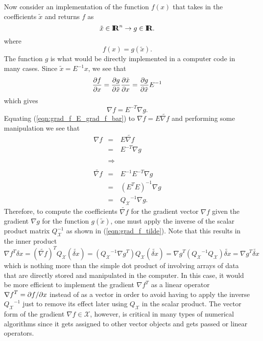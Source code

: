 Now consider an implementation of the function $f(x)$ that takes in the coefficients
$\tilde{x}$ and returns $f$ as
%
\[
\tilde{x}\in\mbox{\textbf{I}}\hspace{-0.6ex}\mbox{\textbf{R}}^n \rightarrow g\in\mbox{\textbf{I}}\hspace{-0.6ex}\mbox{\textbf{R}}.
\]
%
where
%
\[
f(x) = g(\tilde{x}).
\]
%
The function $g$ is what would be directly implemented in a computer code in
many cases.  Since $\tilde{x} = E^{-1} x$, we see that
%
\[
\displaystyle{\frac{\partial f}{\partial x}} = \displaystyle{\frac{\partial g}{\partial \tilde{x}}} \displaystyle{\frac{\partial \tilde{x}}{\partial x}}  = \displaystyle{\frac{\partial g}{\partial \tilde{x}}} E^{-1}
\]
%
which gives
%
\begin{equation}
\nabla f = E^{-T} \nabla g.
\label{eqn:grad_f_E_grad_f_bar}
\end{equation}
%
Equating (\ref{eqn:grad_f_E_grad_f_bar}) to $\nabla f = E {}\tilde{\nabla f}$
and performing some manipulation we see that
%
\begin{eqnarray}
\nabla f
& = & E \tilde{\nabla f} \nonumber \\
& = & E^{-T} \nabla g \nonumber \\
& & \nonumber \\
& \Rightarrow & \nonumber \\
& & \nonumber \\
\tilde{\nabla f}
& = & E^{-1} E^{-T} \nabla g \nonumber \\
& = & (E^T E)^{-1} \nabla g \nonumber \\
& = & {Q_{\mathcal{X}}}^{-1} \nabla g.
\label{eqn:grad_f_tilde}
\end{eqnarray}
%
Therefore, to compute the coefficients $\tilde{\nabla f}$ for the gradient
vector $\nabla f$ given the gradient $\nabla g$ for the function
$g(\tilde{x})$, one must apply the inverse of the scalar product matrix
$Q_{\mathcal{X}}^{-1}$ as shown in (\ref{eqn:grad_f_tilde}).  Note that this
results in the inner product
%
\[
{\nabla f}^T \delta x = (\tilde{\nabla f})^T Q_{\mathcal{X}} (\tilde{\delta x})
= ({Q_{\mathcal{X}}}^{-1} {\nabla g}^T) Q_{\mathcal{X}} (\tilde{\delta x})
= {\nabla g}^T ( {Q_{\mathcal{X}}}^{-1} Q_{\mathcal{X}} ) \tilde{\delta x}
= {\nabla g}^T \tilde{\delta x}
\]
%
which is nothing more than the simple dot product of involving arrays of data
that are directly stored and manipulated in the computer.  In this case, it
would be more efficient to implement the gradient ${\nabla f}^T$ as a linear
operator ${\nabla f}^T = {}\partial f / \partial x$ instead of as a vector in order to
avoid having to apply the inverse ${Q_{\mathcal{X}}}^{-1}$ just to remove its
effect later using $Q_{\mathcal{X}}$ in the scalar product.  The vector form
of the gradient $\nabla f\in\mathcal{X}$, however, is critical in many types
of numerical algorithms since it gets assigned to other vector objects and
gets passed or linear operators.

